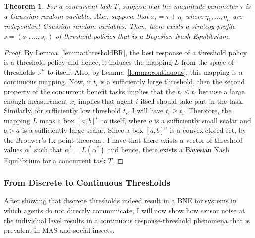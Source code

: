 \documentclass[defaultstyle,12pt]{proposal}
\newtheorem{theorem}{Theorem}
\def\R{\mathbb{R}}
\begin{document}
\begin{theorem}\label{thrm:mainthrm}
For a concurrent task $T$, suppose that the magnitude parameter $\tau$ is a Gaussian random variable. Also, suppose that $x_i=\tau+\eta_i$ where $\eta_1,\ldots,\eta_n$ are independent Gaussian random variables. Then, there exists a strategy profile $s=(s_1,\ldots,s_n)$ of threshold policies that is a Bayesian Nash Equilibrium.
\end{theorem}
\begin{proof}
By Lemma~\ref{lemma:thresholdBR}, the best response of a threshold policy is a threshold policy and hence, it induces the mapping $L$ from the space of thresholds $\R^n$ to itself. Also, by Lemma~\ref{lemma:continuous}, this mapping is a continuous mapping. Now, if $t_i$ is a sufficiently large threshold, then the second property of the concurrent benefit tasks implies that the $\tilde{t}_i\leq t_i$ because a large enough measurement $x_i$ implies that agent $i$ itself should take part in the task. Similarly, for sufficiently low threshold $t_i$, I will have $\tilde{t}_i\geq t_i$. Therefore, the mapping $L$ maps a box $[a,b]^n$ to itself, where $a$ is a sufficiently small scalar and $b>a$ is a sufficiently large scalar. Since a box $[a,b]^n$ is a convex closed set, by the Brouwer's fix point theorem \cite{Border1990}, I have that there exists a vector of threshold values $\alpha^*$ such that $\alpha^*=L(\alpha^*)$ and hence, there exists a Bayesian Nash Equilibrium for a concurrent task $T$.
\end{proof}


\subsubsection{From Discrete to Continuous Thresholds}\label{subsec:sigfun}
After showing that discrete thresholds indeed result in a BNE for systems in which agents do not directly communicate, I will now show how sensor noise at the individual level results in a continuous response-threshold phenomena that is prevalent in MAS and social insects. 
\end{document}
